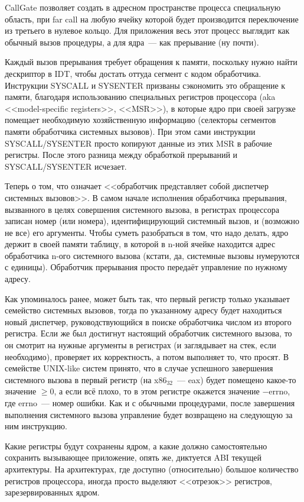 CallGate позволяет создать в адресном пространстве процесса специальную область, при far call на любую ячейку которой будет производится переключение из третьего в нулевое кольцо.
Для приложения весь этот процесс выглядит как обычный вызов процедуры, а для ядра~--- как прерывание (ну почти).

Каждый вызов прерывания требует обращения к памяти, поскольку нужно найти дескриптор в IDT, чтобы достать оттуда сегмент с кодом обработчика.
Инструкции SYSCALL и SYSENTER призваны сэкономить это обращение к памяти, благодаря использованию специальных регистров процессора (aka <<model-specific registers>>, <<MSR>>), в которые ядро при своей загрузке помещает необходимую хозяйственную информацию (селекторы сегментов памяти обработчика системных вызовов).
При этом сами инструкции SYSCALL/SYSENTER просто копируют данные из этих MSR в рабочие регистры.
После этого разница между обработкой прерываний и SYSCALL/SYSENTER исчезает.

Теперь о том, что означает <<обработчик представляет собой диспетчер системных вызовов>>.
В самом начале исполнения обработчика прерывания, вызванного в целях совершения системного вызова, в регистрах процессора записан номер (или номера), идентифицирующий системный вызов, и (возможно не все) его аргументы.
Чтобы суметь разобраться в том, что надо делать, ядро держит в своей памяти таблицу, в которой в n-ной ячейке находится адрес обработчика n-ого системного вызова (кстати, да, системные вызовы нумеруются с единицы).
Обработчик прерывания просто передаёт управление по нужному адресу.

Как упоминалось ранее, может быть так, что первый регистр только указывает семейство системных вызовов, тогда по указанному адресу будет находиться новый диспетчер, руководствующийся в поиске обработчика числом из второго регистра.
Если же был достигнут настоящий обработчик системного вызова, то он смотрит на нужные аргументы в регистрах (и заглядывает на стек, если необходимо), проверяет их корректность, а потом выполняет то, что просят.
В семействе UNIX-like систем принято, что в случае успешного завершения системного вызова в первый регистр (на x$86_{32}$~--- eax) будет помещено какое-то значение $\geq 0$, а если всё плохо, то в этом регистре окажется значение $-$errno, где errno~--- номер ошибки.
Как и с обычными процедурами, после завершения выполнения системного вызова управление будет возвращено на следующую за ним инструкцию.

Какие регистры будут сохранены ядром, а какие должно самостоятельно сохранить вызывающее приложение, опять же, диктуется ABI текущей архитектуры.
На архитектурах, где доступно (относительно) большое количество регистров процессора, иногда просто выделяют <<отрезок>> регистров, зарезервированных ядром.

